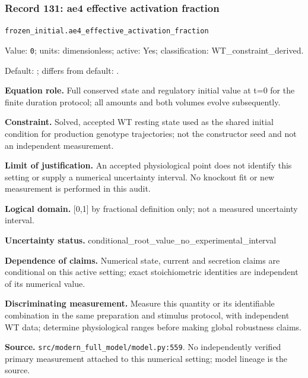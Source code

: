 \subsubsection*{Record 131: ae4 effective activation fraction}
{\small \nolinkurl{frozen_initial.ae4_effective_activation_fraction}\par

Value: \texttt{0}; units: dimensionless; active: Yes; classification: WT\_constraint\_derived.\par

Default: ; differs from default: .\par

\textbf{Equation role.} Full conserved state and regulatory initial value at t=0 for the finite duration protocol; all amounts and both volumes evolve subsequently.\par

\textbf{Constraint.} Solved, accepted WT resting state used as the shared initial condition for production genotype trajectories; not the constructor seed and not an independent measurement.\par

\textbf{Limit of justification.} An accepted physiological point does not identify this setting or supply a numerical uncertainty interval. No knockout fit or new measurement is performed in this audit.\par

\textbf{Logical domain.} [0,1] by fractional definition only; not a measured uncertainty interval.\par

\textbf{Uncertainty status.} conditional\_root\_value\_no\_experimental\_interval\par

\textbf{Dependence of claims.} Numerical state, current and secretion claims are conditional on this active setting; exact stoichiometric identities are independent of its numerical value.\par

\textbf{Discriminating measurement.} Measure this quantity or its identifiable combination in the same preparation and stimulus protocol, with independent WT data; determine physiological ranges before making global robustness claims.\par

\textbf{Source.} \nolinkurl{src/modern_full_model/model.py:559}. No independently verified primary measurement attached to this numerical setting; model lineage is the source.\par}

